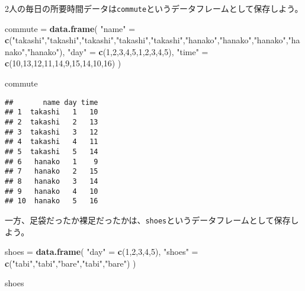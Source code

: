 \documentclass[]{book}
\newenvironment{Shaded}{\begin{snugshade}}{\end{snugshade}}
\newcommand{\KeywordTok}[1]{\textcolor[rgb]{0.13,0.29,0.53}{\textbf{#1}}}
\newcommand{\DecValTok}[1]{\textcolor[rgb]{0.00,0.00,0.81}{#1}}
\newcommand{\StringTok}[1]{\textcolor[rgb]{0.31,0.60,0.02}{#1}}
\newcommand{\NormalTok}[1]{#1}
\begin{document}
2人の毎日の所要時間データは\texttt{commute}というデータフレームとして保存しよう。

\begin{Shaded}
\begin{Highlighting}[]
\NormalTok{commute =}\StringTok{ }\KeywordTok{data.frame}\NormalTok{(}
  \StringTok{"name"}\NormalTok{ =}\StringTok{ }\KeywordTok{c}\NormalTok{(}\StringTok{"takashi"}\NormalTok{,}\StringTok{"takashi"}\NormalTok{,}\StringTok{"takashi"}\NormalTok{,}\StringTok{"takashi"}\NormalTok{,}\StringTok{"takashi"}\NormalTok{,}\StringTok{"hanako"}\NormalTok{,}\StringTok{"hanako"}\NormalTok{,}\StringTok{"hanako"}\NormalTok{,}\StringTok{"hanako"}\NormalTok{,}\StringTok{"hanako"}\NormalTok{),}
  \StringTok{"day"}\NormalTok{ =}\StringTok{ }\KeywordTok{c}\NormalTok{(}\DecValTok{1}\NormalTok{,}\DecValTok{2}\NormalTok{,}\DecValTok{3}\NormalTok{,}\DecValTok{4}\NormalTok{,}\DecValTok{5}\NormalTok{,}\DecValTok{1}\NormalTok{,}\DecValTok{2}\NormalTok{,}\DecValTok{3}\NormalTok{,}\DecValTok{4}\NormalTok{,}\DecValTok{5}\NormalTok{),}
  \StringTok{"time"}\NormalTok{ =}\StringTok{ }\KeywordTok{c}\NormalTok{(}\DecValTok{10}\NormalTok{,}\DecValTok{13}\NormalTok{,}\DecValTok{12}\NormalTok{,}\DecValTok{11}\NormalTok{,}\DecValTok{14}\NormalTok{,}\DecValTok{9}\NormalTok{,}\DecValTok{15}\NormalTok{,}\DecValTok{14}\NormalTok{,}\DecValTok{10}\NormalTok{,}\DecValTok{16}\NormalTok{)}
\NormalTok{)}

\NormalTok{commute}
\end{Highlighting}
\end{Shaded}

\begin{verbatim}
##       name day time
## 1  takashi   1   10
## 2  takashi   2   13
## 3  takashi   3   12
## 4  takashi   4   11
## 5  takashi   5   14
## 6   hanako   1    9
## 7   hanako   2   15
## 8   hanako   3   14
## 9   hanako   4   10
## 10  hanako   5   16
\end{verbatim}

一方、足袋だったか裸足だったかは、\texttt{shoes}というデータフレームとして保存しよう。

\begin{Shaded}
\begin{Highlighting}[]
\NormalTok{shoes =}\StringTok{ }\KeywordTok{data.frame}\NormalTok{(}
  \StringTok{"day"}\NormalTok{ =}\StringTok{ }\KeywordTok{c}\NormalTok{(}\DecValTok{1}\NormalTok{,}\DecValTok{2}\NormalTok{,}\DecValTok{3}\NormalTok{,}\DecValTok{4}\NormalTok{,}\DecValTok{5}\NormalTok{),}
  \StringTok{"shoes"}\NormalTok{ =}\StringTok{ }\KeywordTok{c}\NormalTok{(}\StringTok{"tabi"}\NormalTok{,}\StringTok{"tabi"}\NormalTok{,}\StringTok{"bare"}\NormalTok{,}\StringTok{"tabi"}\NormalTok{,}\StringTok{"bare"}\NormalTok{)}
\NormalTok{)}

\NormalTok{shoes}
\end{Highlighting}
\end{Shaded}
\end{document}
